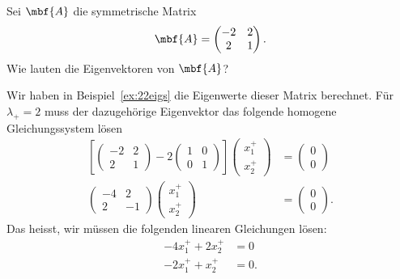 \begin{beispiel}
  Sei $\mbf{A}$ die symmetrische Matrix 
  \begin{equation}
    \mbf{A} = \begin{pmatrix}
      -2 & 2 \\ 2 & 1
    \end{pmatrix}.
  \end{equation}
  Wie lauten die Eigenvektoren von $\mbf{A}$?
\end{beispiel}
\begin{lösung}
  Wir haben in Beispiel~\ref{ex:22eigs} die Eigenwerte dieser Matrix berechnet. Für $\lambda_+=2$ muss der dazugehörige Eigenvektor das folgende homogene Gleichungssystem lösen
  \begin{equation}
    \begin{split}
      \left[\begin{pmatrix}
      -2 & 2 \\ 2 & 1
    \end{pmatrix}-2\begin{pmatrix}
      1 & 0 \\ 0 & 1
    \end{pmatrix}\right] \begin{pmatrix}
      x_1^+ \\ 
      x_2^+
    \end{pmatrix} &= \begin{pmatrix}
    0\\ 0
    \end{pmatrix} \\
    \begin{pmatrix}
      -4 & 2 \\ 2 & -1
    \end{pmatrix}\begin{pmatrix}
      x_1^+ \\ 
      x_2^+
    \end{pmatrix} &= \begin{pmatrix}
    0\\ 0
    \end{pmatrix}.
    \end{split}
  \end{equation}
  Das heisst, wir müssen die folgenden linearen Gleichungen lösen:
  \begin{equation}
    \begin{split}
      -4x_1^+ +2x_2^+ &= 0 \\
      -2x_1^+ + x_2^+ &= 0.
    \end{split}
  \end{equation}

\end{lösung}
